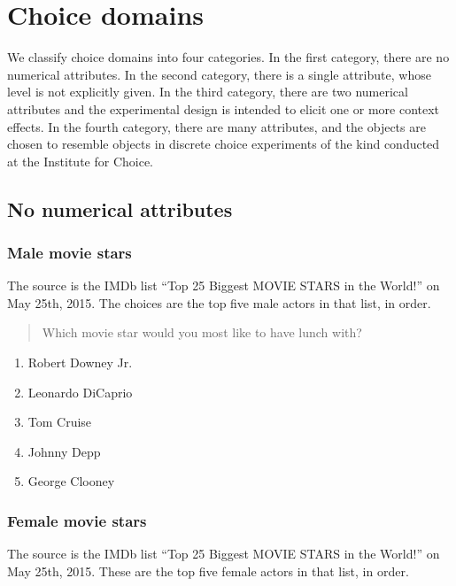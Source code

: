 \documentclass[11pt,letter]{amsart}
\begin{document}
\section{Choice domains}

\label{s:domains}

We classify choice domains into four categories. In the first category,
there are no numerical attributes. In the second category, there is a single
attribute, whose level is not explicitly given. In the third category, there
are two numerical attributes and the experimental design is intended to
elicit one or more context effects. In the fourth category, there are many
attributes, and the objects are chosen to resemble objects in discrete
choice experiments of the kind conducted at the Institute for Choice.

\subsection{No numerical attributes}

\subsubsection{Male movie stars}

The source is the IMDb list ``Top 25 Biggest MOVIE STARS in the World!'' on
May 25th, 2015. The choices are the top five male actors in that list, in
order.

\begin{quotation}
Which movie star would you most like to have lunch with?
\end{quotation}

\begin{enumerate}
\item Robert Downey Jr. 

\item Leonardo DiCaprio 

\item Tom Cruise 

\item Johnny Depp 

\item George Clooney
\end{enumerate}

\subsubsection{Female movie stars}

The source is the IMDb list ``Top 25 Biggest MOVIE STARS in the World!'' on
May 25th, 2015. These are the top five female actors in that list, in order.
\end{document}
